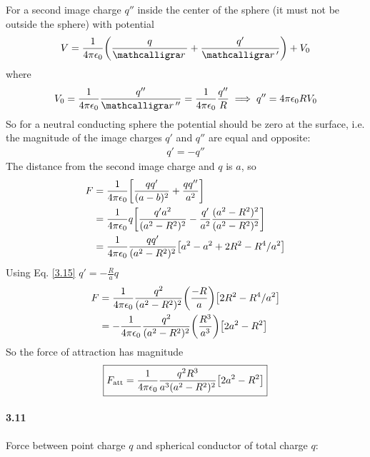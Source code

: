 \documentclass[../main.tex]{subfiles}
\begin{document}
For a second image charge $q''$ inside the center of the sphere (it must not be outside the sphere) with potential
\begin{align*}
    V = \ke \qt(
        \frac{q}{\scriptr} + \frac{q'}{\scriptr'}
    ) + V_0
\end{align*}
where 
\begin{align*}
    V_0 = \ke \frac{q''}{\scriptr''} = \ke \frac{q''}{R} \implies q'' = 4\pi\epsilon_0 R V_0
\end{align*}
So for a neutral conducting sphere the potential should be zero at the surface, i.e. the magnitude of the image charges $q'$ and $q''$ are equal and opposite:
\begin{align*}
    q' = -q''
\end{align*}
The distance from the second image charge and $q$ is $a$, so
\begin{align*}
    F &= \ke \qt[
        \frac{qq'}{(a - b)^2} + \frac{qq''}{a^2}
    ]  \\
    &= \ke q\qt[
        \frac{q' a^2}{(a^2 - R^2)^2} - \frac{q'}{a^2} \frac{(a^2 - R^2)^2}{(a^2 - R^2)^2}
    ] \\
    &= \ke \frac{qq'}{(a^2 - R^2)^2} \qt[
        a^2 - a^2 + 2R^2 - R^4 / a^2 
    ] \\
\end{align*}
Using Eq. \eqref{3.15} $ q' = -\frac{R}{a} q$
\begin{align*}
    F &= \ke \frac{q^2}{(a^2 - R^2)^2} \qt(\frac{-R}{a}) \qt[
        2R^2 - R^4 / a^2
    ] \\ 
    &= -\ke \frac{q^2}{(a^2 - R^2)^2} \qt(\frac{R^3}{a^3}) \qt[
        2a^2 - R^2
    ] 
\end{align*}
So the force of attraction has magnitude
\begin{align*}
    \boxed{
        F_\text{att} = \ke \frac{q^2 R^3}{a^3 (a^2 - R^2)^2} \qt[
            2a^2 - R^2
        ]
    }
\end{align*}

\newpage 
\paragraph{3.11} Force between point charge $q$ and spherical conductor of total charge $q$:
\end{document}
